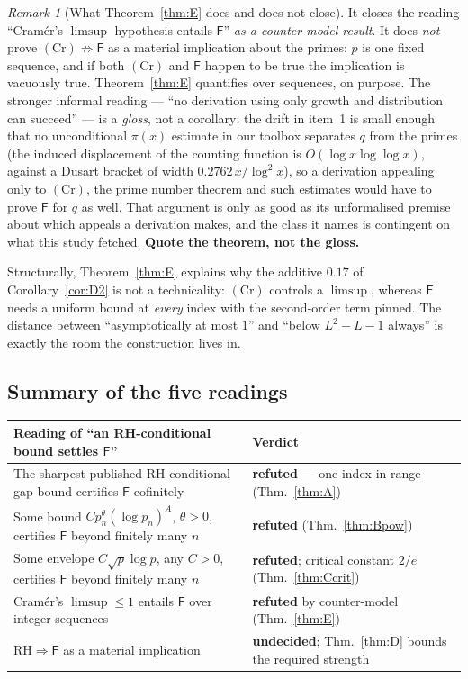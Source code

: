 \documentclass[11pt,a4paper]{article}
\theoremstyle{plain}
\theoremstyle{definition}
\theoremstyle{remark}
\newtheorem{remark}[theorem]{Remark}
\newcommand{\Fb}{\mathsf{F}}
\begin{document}
\begin{remark}[What Theorem~\ref{thm:E} does and does not close]
\label{rem:E-scope}
It closes the reading ``Cram\'er's $\limsup$ hypothesis entails $\Fb$'' \emph{as a
counter-model result}. It does \emph{not} prove $(\mathrm{Cr}) \not\Rightarrow \Fb$ as a
material implication about the primes: $p$ is one fixed sequence, and if both
$(\mathrm{Cr})$ and $\Fb$ happen to be true the implication is vacuously true.
Theorem~\ref{thm:E} quantifies over sequences, on purpose. The stronger informal reading ---
``no derivation using only growth and distribution can succeed'' --- is a \emph{gloss}, not a
corollary: the drift in item~1 is small enough that no unconditional $\pi(x)$ estimate in our
toolbox separates $q$ from the primes (the induced displacement of the counting function is
$O(\log x\log\log x)$, against a Dusart bracket of width $0.2762\,x/\log^2 x$), so a
derivation appealing only to $(\mathrm{Cr})$, the prime number theorem and such estimates
would have to prove $\Fb$ for $q$ as well. That argument is only as good as its unformalised
premise about which appeals a derivation makes, and the class it names is contingent on what
this study fetched. \textbf{Quote the theorem, not the gloss.}
\end{remark}

Structurally, Theorem~\ref{thm:E} explains why the additive $0.17$ of
Corollary~\ref{cor:D2} is not a technicality: $(\mathrm{Cr})$ controls a $\limsup$, whereas
$\Fb$ needs a uniform bound at \emph{every} index with the second-order term pinned. The
distance between ``asymptotically at most $1$'' and ``below $L^2 - L - 1$ always'' is exactly
the room the construction lives in.

\subsection{Summary of the five readings}

\begin{center}
\small
\begin{tabular}{@{}p{} p{}@{}}
\toprule
Reading of ``an RH-conditional bound settles $\Fb$'' & Verdict \\
\midrule
The sharpest published RH-conditional gap bound certifies $\Fb$ cofinitely &
  \textbf{refuted} --- one index in range (Thm.~\ref{thm:A}) \\
Some bound $C p_n^\theta(\log p_n)^A$, $\theta > 0$, certifies $\Fb$ beyond finitely many $n$ &
  \textbf{refuted} (Thm.~\ref{thm:Bpow}) \\
Some envelope $C\sqrt{p}\log p$, any $C > 0$, certifies $\Fb$ beyond finitely many $n$ &
  \textbf{refuted}; critical constant $2/e$ (Thm.~\ref{thm:Ccrit}) \\
Cram\'er's $\limsup \le 1$ entails $\Fb$ over integer sequences &
  \textbf{refuted} by counter-model (Thm.~\ref{thm:E}) \\
$\mathrm{RH} \Rightarrow \Fb$ as a material implication &
  \textbf{undecided}; Thm.~\ref{thm:D} bounds the required strength \\
\bottomrule
\end{tabular}
\end{center}
\end{document}
